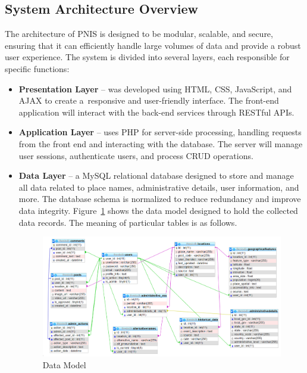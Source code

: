 \subsection{System Architecture Overview}
The architecture of PNIS is designed to be modular, scalable, and secure, ensuring that it can efficiently handle large volumes of data and provide a robust user experience. 
The system is divided into several layers, each responsible for specific functions:
\begin{itemize}
\item \textbf{Presentation Layer} -- was developed using HTML, CSS, JavaScript, and AJAX to create a~responsive and user-friendly interface. The front-end application will interact with the back-end services through RESTful APIs.
\item \textbf{Application Layer}  -- uses PHP for server-side processing, handling requests from the front end and interacting with the database. The server will manage user sessions, authenticate users, and process CRUD operations.
\item \textbf{Data Layer} -- a MySQL relational database designed to store and manage all data related to place names, administrative details, user information, and more. The database schema is normalized to reduce redundancy and improve data integrity. Figure~\ref{fig:dataModel} shows the data model designed to hold the collected data records. The meaning of particular tables is as follows.
\begin{figure}[htb]
    \centering
    \includegraphics[width=1\linewidth]{model_schema.png}
    \caption{Data Model}
    \label{fig:dataModel}
\end{figure}

\end{itemize}
